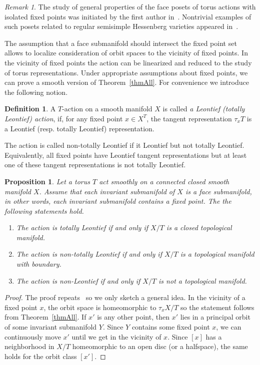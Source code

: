\documentclass[english,12pt,oneside]{amsproc}
\newcounter{stmcounter}[section]
\numberwithin{equation}{section}
\theoremstyle{plain}
\newtheorem{prop}[stmcounter]{Proposition}
\theoremstyle{definition}
\newtheorem{defin}[stmcounter]{Definition}
\theoremstyle{remark}
\newtheorem{rem}[stmcounter]{Remark}
\begin{document}
\begin{rem}
The study of general properties of the face posets of torus actions with isolated fixed points was initiated by the first author in~\cite{AyzCherep,AyzMasSolo}. Nontrivial examples of such posets related to regular semisimple Hessenberg varieties appeared in~\cite{AyzBuchGraph}.
\end{rem}

The assumption that a face submanifold should intersect the fixed point set allows to localize consideration of orbit spaces to the vicinity of fixed points. In the vicinity of fixed points the action can be linearized and reduced to the study of torus representations. Under appropriate assumptions about fixed points, we can prove a smooth version of Theorem~\ref{thmAll}. For convenience we introduce the following notion.

\begin{defin}\label{definLeontActn}
A $T$-action on a smooth manifold $X$ is called \emph{a Leontief (totally Leontief) action}, if, for any fixed point $x\in X^T$, the tangent representation $\tau_xT$ is a Leontief (resp. totally Leontief) representation.
\end{defin}

The action is called non-totally Leontief if it Leontief but not totally Leontief. Equivalently, all fixed points have Leontief tangent representations but at least one of these tangent representations is not totally Leontief.

\begin{prop}\label{propOrbitsLeontief}
Let a torus $T$ act smoothly on a connected closed smooth manifold $X$. Assume that each invariant submanifold of $X$ is a face submanifold, in other words, each invariant submanifold contains a fixed point. The the following statements hold.
\begin{enumerate}
  \item The action is totally Leontief if and only if $X/T$ is a closed topological manifold.
  \item The action is non-totally Leontief if and only if $X/T$ is a topological manifold with boundary.
  \item The action is non-Leontief if and only if $X/T$ is not a topological manifold.
\end{enumerate}
\end{prop}

\begin{proof}
The proof repeats~\cite[Thm.2.10]{AyzCompl} so we only sketch a general idea. In the vicinity of a fixed point $x$, the orbit space is homeomorphic to $\tau_xX/T$ so the statement follows from Theorem~\ref{thmAll}. If $x'$ is any other point, then $x'$ lies in a principal orbit of some invariant submanifold $Y$. Since $Y$ contains some fixed point $x$, we can continuously move $x'$ until we get in the vicinity of $x$. Since $[x]$ has a neighborhood in $X/T$ homeomorphic to an open disc (or a halfspace), the same holds for the orbit class $[x']$.
\end{proof}
\end{document}
